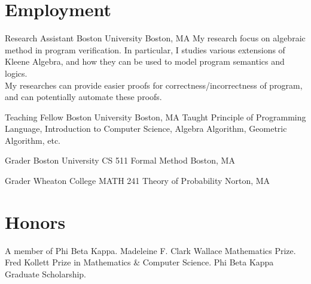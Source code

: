 \documentclass[11pt,roman]{moderncv}        %
\begin{document}
\section{Employment}

{Research Assistant}
{Boston University}
{Boston, MA}{}
{My research focus on algebraic method in program verification.
In particular, I studies various extensions of Kleene Algebra, 
and how they can be used to model program semantics and logics.\\
My researches can provide easier proofs for correctness/incorrectness of program,
and can potentially automate these proofs.
}

{Teaching Fellow}
{Boston University}
{Boston, MA}{}
{
  Taught Principle of Programming Language, Introduction to Computer Science,
  Algebra Algorithm, Geometric Algorithm, etc.
}

{Grader}
{Boston University CS 511 Formal Method}
{Boston, MA}{}{}

{Grader}
{Wheaton College MATH 241 Theory of Probability}
{Norton, MA}{}{}



\section{Honors}
 {A member of Phi Beta Kappa.}
 {
  Madeleine F. Clark Wallace Mathematics Prize. \newline
  Fred Kollett Prize in Mathematics \& Computer Science. \newline
  Phi Beta Kappa Graduate Scholarship.
}
\end{document}
